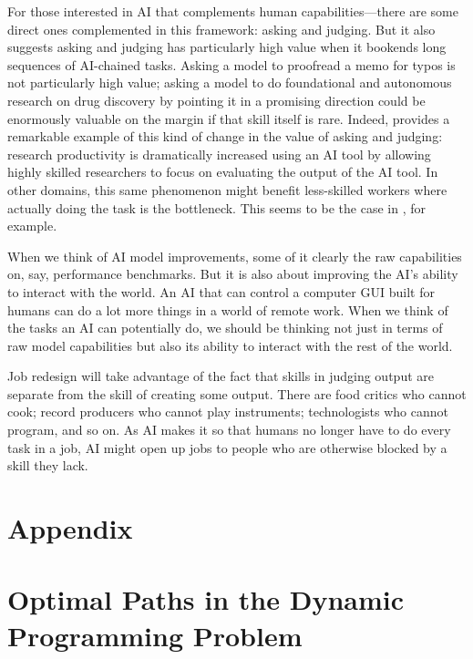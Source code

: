 \documentclass{article}
\theoremstyle{plain}
\theoremstyle{plain}
\begin{document}
For those interested in AI that complements human capabilities---there are some direct ones complemented in this framework: asking and judging.
But it also suggests asking and judging has particularly high value when it bookends long sequences of AI-chained tasks.
Asking a model to proofread a memo for typos is not particularly high value;
asking a model to do foundational and autonomous research on drug discovery by pointing it in a promising direction could be enormously valuable on the margin if that skill itself is rare.
Indeed, \cite{toner2024artificial} provides a remarkable example of this kind of change in the value of asking and judging:
research productivity is dramatically increased using an AI tool by allowing highly skilled researchers to focus on evaluating the output of the AI tool.
In other domains, this same phenomenon might benefit less-skilled workers where actually doing the task is the bottleneck.
This seems to be the case in \cite{brynjolfsson2023generative}, for example.
  
When we think of AI model improvements, some of it clearly the raw capabilities on, say, performance benchmarks. 
But it is also about improving the AI's ability to interact with the world. 
An AI that can control a computer GUI built for humans can do a lot more things in a world of remote work.
When we think of the tasks an AI can potentially do, we should be thinking not just in terms of raw model capabilities but also its ability to interact with the rest of the world.

Job redesign will take advantage of the fact that skills in judging output are separate from the skill of creating some output.
There are food critics who cannot cook; record producers who cannot play instruments; technologists who cannot program, and so on.
As AI makes it so that humans no longer have to do every task in a job, AI might open up jobs to people who are otherwise blocked by a skill they lack.




\newpage
\appendix
\section*{Appendix}

\section{Optimal Paths in the Dynamic Programming Problem}
\label{app:dp_proof}
\end{document}
